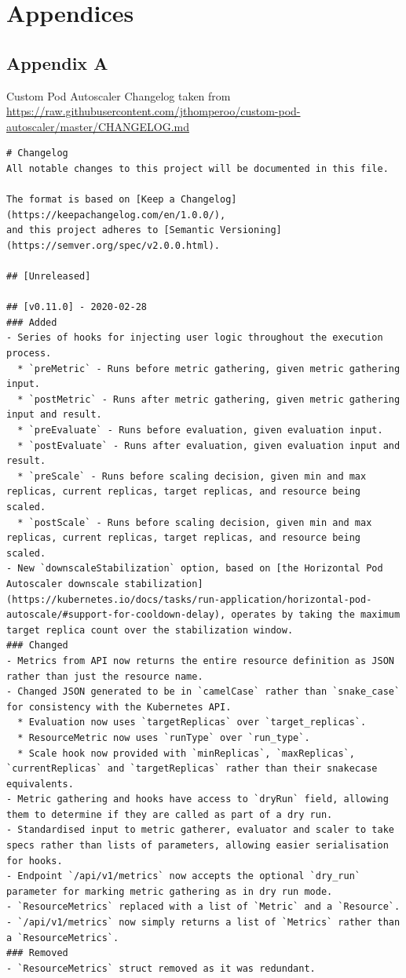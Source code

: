 \newpage

\section{Appendices}

\subsection{Appendix A}

Custom Pod Autoscaler Changelog taken from
\url{https://raw.githubusercontent.com/jthomperoo/custom-pod-autoscaler/master/CHANGELOG.md}

\begin{lstlisting}
# Changelog
All notable changes to this project will be documented in this file.

The format is based on [Keep a Changelog](https://keepachangelog.com/en/1.0.0/),
and this project adheres to [Semantic Versioning](https://semver.org/spec/v2.0.0.html).

## [Unreleased]

## [v0.11.0] - 2020-02-28
### Added
- Series of hooks for injecting user logic throughout the execution process.
  * `preMetric` - Runs before metric gathering, given metric gathering input.
  * `postMetric` - Runs after metric gathering, given metric gathering input and result.
  * `preEvaluate` - Runs before evaluation, given evaluation input.
  * `postEvaluate` - Runs after evaluation, given evaluation input and result.
  * `preScale` - Runs before scaling decision, given min and max replicas, current replicas, target replicas, and resource being scaled.
  * `postScale` - Runs before scaling decision, given min and max replicas, current replicas, target replicas, and resource being scaled.
- New `downscaleStabilization` option, based on [the Horizontal Pod Autoscaler downscale stabilization](https://kubernetes.io/docs/tasks/run-application/horizontal-pod-autoscale/#support-for-cooldown-delay), operates by taking the maximum target replica count over the stabilization window.
### Changed
- Metrics from API now returns the entire resource definition as JSON rather than just the resource name.
- Changed JSON generated to be in `camelCase` rather than `snake_case` for consistency with the Kubernetes API.
  * Evaluation now uses `targetReplicas` over `target_replicas`.
  * ResourceMetric now uses `runType` over `run_type`.
  * Scale hook now provided with `minReplicas`, `maxReplicas`, `currentReplicas` and `targetReplicas` rather than their snakecase equivalents.
- Metric gathering and hooks have access to `dryRun` field, allowing them to determine if they are called as part of a dry run.
- Standardised input to metric gatherer, evaluator and scaler to take specs rather than lists of parameters, allowing easier serialisation for hooks.
- Endpoint `/api/v1/metrics` now accepts the optional `dry_run` parameter for marking metric gathering as in dry run mode.
- `ResourceMetrics` replaced with a list of `Metric` and a `Resource`.
- `/api/v1/metrics` now simply returns a list of `Metrics` rather than a `ResourceMetrics`.
### Removed
- `ResourceMetrics` struct removed as it was redundant.


\end{lstlisting}
